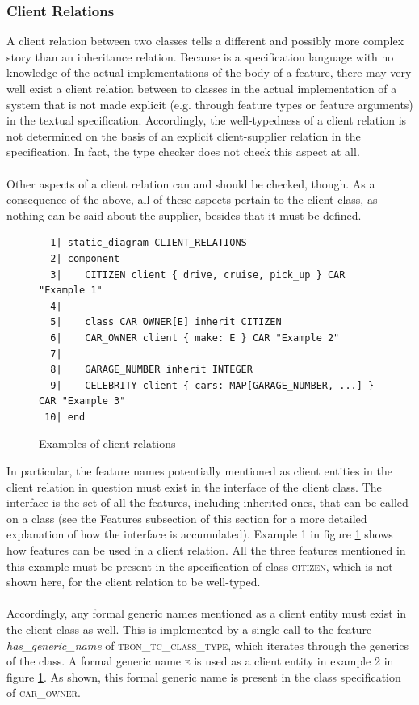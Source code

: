 \subsubsection{Client Relations}
A client relation between two classes tells a different and possibly more complex story than an inheritance relation. Because \bon{} is a specification language with no knowledge of the actual implementations of the body of a feature, there may very well exist a client relation between to classes in the actual implementation of a system that is not made explicit (e.g. through feature types or feature arguments) in the textual \bon{} specification. Accordingly, the well-typedness of a client relation is not determined on the basis of an explicit client-supplier relation in the specification. In fact, the type checker does not check this aspect at all.
\paragraph{}
Other aspects of a client relation can and should be checked, though. As a consequence of the above, all of these aspects pertain to the client class, as nothing can be said about the supplier, besides that it must be defined.
\begin{figure}[H]
{\footnotesize
\begin{verbatim}
  1| static_diagram CLIENT_RELATIONS
  2| component
  3|    CITIZEN client { drive, cruise, pick_up } CAR "Example 1"
  4|  
  5|    class CAR_OWNER[E] inherit CITIZEN
  6|    CAR_OWNER client { make: E } CAR "Example 2"
  7| 
  8|    GARAGE_NUMBER inherit INTEGER
  9|    CELEBRITY client { cars: MAP[GARAGE_NUMBER, ...] } CAR "Example 3"
 10| end
\end{verbatim}
}
\caption{Examples of client relations}
\label{fig:client_relations}
\end{figure}
In particular, the feature names potentially mentioned as client entities in the client relation in question must exist in the interface of the client class. The interface is the set of all the features, including inherited ones, that can be called on a class (see the Features subsection of this section for a more detailed explanation of how the interface is accumulated). Example 1 in figure \ref{fig:client_relations} shows how features can be used in a client relation. All the three features mentioned in this example must be present in the specification of class \textsc{citizen}, which is not shown here, for the client relation to be well-typed.
\paragraph{}
Accordingly, any formal generic names mentioned as a client entity must exist in the client class as well. This is implemented by a single call to the feature \textit{has\_generic\_name} of \textsc{tbon\_tc\_class\_type}, which iterates through the generics of the class. A formal generic name \textsc{e} is used as a client entity in example 2 in figure \ref{fig:client_relations}. As shown, this formal generic name is present in the class specification of \textsc{car\_owner}.

